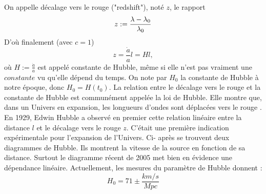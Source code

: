 \documentclass[a4paper,12pt]{report}
\theoremstyle{plain}
\theoremstyle{plain}
\begin{document}
      	On appelle d\'ecalage vers le rouge ("redshift"), not\'e $z$, le rapport 
      	\begin{equation}
      	z:= \frac{\lambda- \lambda_0}{\lambda_0} \\
      	\end{equation}
      	D'o\`{u} finalement (avec $c=1$)
      	\begin{equation}
      	z=\frac{\dot{a}}{a}l= Hl,
      	\end{equation}
      	o\`{u} $H:=\frac{\dot{a}}{a}$ est appel\'e constante de Hubble, m\^{e}me si elle n'est  pas vraiment une $constante $ vu qu'elle d\'epend du temps. On note par $H_0$ la constante de Hubble \`a notre \'epoque, donc $H_0=H\left(t_0 \right) $. La relation entre le d\'ecalage vers le rouge et la constante de Hubble est commun\'ement appel\'ee la loi de Hubble. Elle montre que, dans un Univers en expansion, les longueurs d'ondes sont d\'eplac\'ees vers le rouge . En 1929, Edwin Hubble a observ\'e en premier cette relation lin\'eaire entre la distance $l$ et le d\'ecalage vers le rouge $z$. C'\'etait une premi\`ere indication exp\'erimentale pour l'expansion de l'Univers. Ci- apr\`es se trouvent deux diagrammes de Hubble. Ils montrent la vitesse de la source en fonction de sa distance. Surtout le diagramme r\'ecent de 2005 met bien en \'evidence une d\'ependance lin\'eaire. Actuellement, les mesures du param\`etre de Hubble donnent  :
      	\begin{equation}
      	H_0= 71 \pm \frac{km/s}{Mpc}
      	\end{equation}
      	
      	
\end{document}
